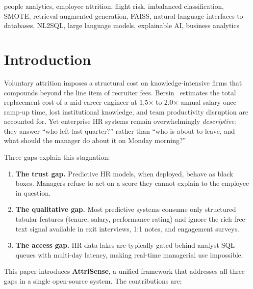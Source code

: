 \documentclass[conference]{IEEEtran}
\begin{document}
\begin{IEEEkeywords}
people analytics, employee attrition, flight risk, imbalanced
classification, SMOTE, retrieval-augmented generation, FAISS,
natural-language interfaces to databases, NL2SQL, large language
models, explainable AI, business analytics
\end{IEEEkeywords}

\section{Introduction}
Voluntary attrition imposes a structural cost on knowledge-intensive
firms that compounds beyond the line item of recruiter fees.
Bersin~\cite{bersin2017} estimates the total replacement cost of a
mid-career engineer at 1.5$\times$ to 2.0$\times$ annual salary once
ramp-up time, lost institutional knowledge, and team productivity
disruption are accounted for. Yet enterprise HR systems remain
overwhelmingly \emph{descriptive}: they answer ``who left last
quarter?'' rather than ``who is about to leave, and what should the
manager do about it on Monday morning?''

Three gaps explain this stagnation:

\begin{enumerate}
\item \textbf{The trust gap.} Predictive HR models, when deployed,
behave as black boxes. Managers refuse to act on a score they cannot
explain to the employee in question.
\item \textbf{The qualitative gap.} Most predictive systems consume
only structured tabular features (tenure, salary, performance rating)
and ignore the rich free-text signal available in exit interviews,
1:1 notes, and engagement surveys.
\item \textbf{The access gap.} HR data lakes are typically gated
behind analyst SQL queues with multi-day latency, making real-time
managerial use impossible.
\end{enumerate}

This paper introduces \textbf{AttriSense}, a unified framework that
addresses all three gaps in a single open-source system. The
contributions are:
\end{document}

